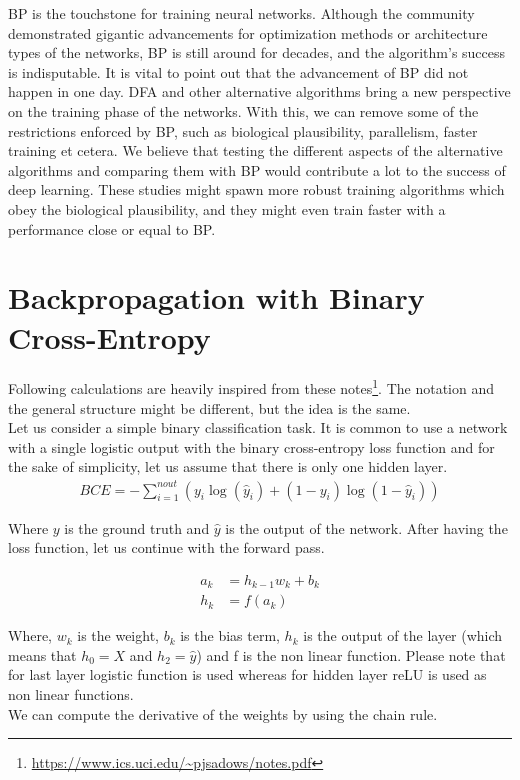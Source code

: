 \documentclass[a4paper, nobind]{templates/ociamthesis}
\begin{document}
BP is the touchstone for training neural networks. Although the community demonstrated gigantic advancements for optimization methods or architecture types of the networks, BP is still around for decades, and the algorithm's success is indisputable. It is vital to point out that the advancement of BP did not happen in one day. DFA and other alternative algorithms bring a new perspective on the training phase of the networks. With this, we can remove some of the restrictions enforced by BP, such as biological plausibility, parallelism, faster training et cetera. We believe that testing the different aspects of the alternative algorithms and comparing them with BP would contribute a lot to the success of deep learning. These studies might spawn more robust training algorithms which obey the biological plausibility, and they might even train faster with a performance close or equal to BP.~

\startappendices

\hypertarget{chap:appendix_a}{%
\chapter{Backpropagation with Binary Cross-Entropy}\label{chap:appendix_a}}

Following calculations are heavily inspired from these notes\footnote{\url{https://www.ics.uci.edu/~pjsadows/notes.pdf}}. The notation and the general structure might be different, but the idea is the same.\\
Let us consider a simple binary classification task. It is common to use a network with a single logistic output with the binary cross-entropy loss function and for the sake of simplicity, let us assume that there is only one hidden layer.
\[
\begin{aligned}
BCE=-\sum_{i=1}^{n o u t}\left(y_i \log \left(\hat{y}_i \right)+\left(1-y_i\right) \log \left(1-\hat{y}_i\right)\right)
\end{aligned}
\]

\noindent Where \(y\) is the ground truth and \(\hat{y}\) is the output of the network. After having the loss function, let us continue with the forward pass.

\[
\begin{aligned} 
a_{k} &= h_{k-1} w_{k} + b_k \\
h_k &= f(a_{k})
\end{aligned}
\]

\noindent Where, \(w_k\) is the weight, \(b_{k}\) is the bias term, \(h_k\) is the output of the layer (which means that \(h_0 = X\) and \(h_2 = \hat{y}\)) and f is the non linear function. Please note that for last layer logistic function is used whereas for hidden layer reLU is used as non linear functions.\\
We can compute the derivative of the weights by using the chain rule.
\end{document}
